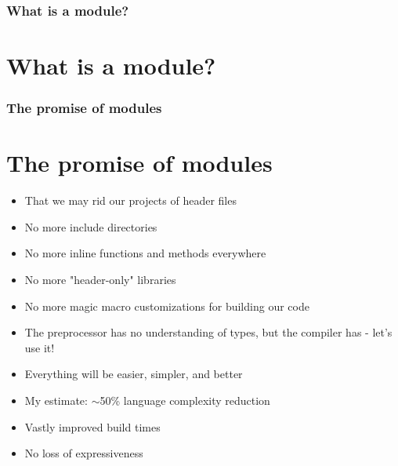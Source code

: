 \documentclass{beamer}
\begin{document}
%
%
\begin{frame}
\frametitle{What is a module?}
\section{What is a module?}
\end{frame}


%
%
\begin{frame}
\frametitle{The promise of modules}
\section{The promise of modules}
\begin{itemize}
\item That we may rid our projects of header files
\item No more include directories
\item No more inline functions and methods everywhere
\item No more "header-only" libraries
\item No more magic macro customizations for building our code
\item The preprocessor has no understanding of types, but the compiler
has - let's use it!
\item Everything will be easier, simpler, and better
\item My estimate: $\sim$50\% language complexity reduction
\item Vastly improved build times
\item No loss of expressiveness
\end{itemize}
\end{frame}
\end{document}
